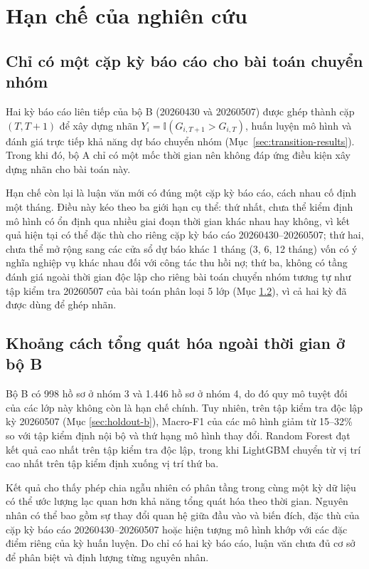 \section{Hạn chế của nghiên cứu}

\subsection{Chỉ có một cặp kỳ báo cáo cho bài toán chuyển nhóm}

Hai kỳ báo cáo liên tiếp của bộ B (20260430 và 20260507) được ghép thành cặp $(T,T+1)$ để xây dựng nhãn $Y_i=\mathbb{I}(G_{i,T+1}>G_{i,T})$, huấn luyện mô hình và đánh giá trực tiếp khả năng dự báo chuyển nhóm (Mục~\ref{sec:transition-results}). Trong khi đó, bộ A chỉ có một mốc thời gian nên không đáp ứng điều kiện xây dựng nhãn cho bài toán này.

Hạn chế còn lại là luận văn mới có đúng một cặp kỳ báo cáo, cách nhau cố định một tháng. Điều này kéo theo ba giới hạn cụ thể: thứ nhất, chưa thể kiểm định mô hình có ổn định qua nhiều giai đoạn thời gian khác nhau hay không, vì kết quả hiện tại có thể đặc thù cho riêng cặp kỳ báo cáo 20260430--20260507; thứ hai, chưa thể mở rộng sang các cửa sổ dự báo khác 1 tháng (3, 6, 12 tháng) vốn có ý nghĩa nghiệp vụ khác nhau đối với công tác thu hồi nợ; thứ ba, không có tầng đánh giá ngoài thời gian độc lập cho riêng bài toán chuyển nhóm tương tự như tập kiểm tra 20260507 của bài toán phân loại 5 lớp (Mục \ref{sec:limit-holdout}), vì cả hai kỳ đã được dùng để ghép nhãn.

\subsection{Khoảng cách tổng quát hóa ngoài thời gian ở bộ B}
\label{sec:limit-holdout}

Bộ B có 998 hồ sơ ở nhóm 3 và 1.446 hồ sơ ở nhóm 4, do đó quy mô tuyệt đối của các lớp này không còn là hạn chế chính. Tuy nhiên, trên tập kiểm tra độc lập kỳ 20260507 (Mục \ref{sec:holdout-b}), Macro-F1 của các mô hình giảm từ 15--32\% so với tập kiểm định nội bộ và thứ hạng mô hình thay đổi. Random Forest đạt kết quả cao nhất trên tập kiểm tra độc lập, trong khi LightGBM chuyển từ vị trí cao nhất trên tập kiểm định xuống vị trí thứ ba.

Kết quả cho thấy phép chia ngẫu nhiên có phân tầng trong cùng một kỳ dữ liệu có thể ước lượng lạc quan hơn khả năng tổng quát hóa theo thời gian. Nguyên nhân có thể bao gồm sự thay đổi quan hệ giữa đầu vào và biến đích, đặc thù của cặp kỳ báo cáo 20260430--20260507 hoặc hiện tượng mô hình khớp với các đặc điểm riêng của kỳ huấn luyện. Do chỉ có hai kỳ báo cáo, luận văn chưa đủ cơ sở để phân biệt và định lượng từng nguyên nhân.

